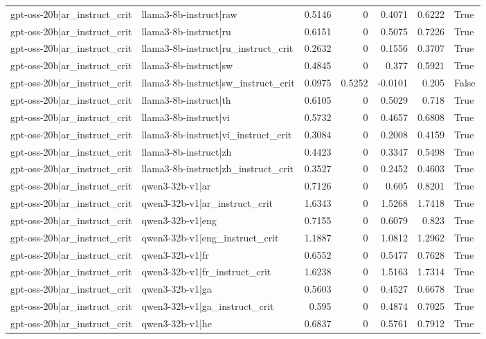\begin{table}
\begin{tabular}{l l r r r r l}
gpt-oss-20b|ar_instruct_crit & llama3-8b-instruct|raw & 0.5146 & 0 & 0.4071 & 0.6222 & True \\
gpt-oss-20b|ar_instruct_crit & llama3-8b-instruct|ru & 0.6151 & 0 & 0.5075 & 0.7226 & True \\
gpt-oss-20b|ar_instruct_crit & llama3-8b-instruct|ru_instruct_crit & 0.2632 & 0 & 0.1556 & 0.3707 & True \\
gpt-oss-20b|ar_instruct_crit & llama3-8b-instruct|sw & 0.4845 & 0 & 0.377 & 0.5921 & True \\
gpt-oss-20b|ar_instruct_crit & llama3-8b-instruct|sw_instruct_crit & 0.0975 & 0.5252 & -0.0101 & 0.205 & False \\
gpt-oss-20b|ar_instruct_crit & llama3-8b-instruct|th & 0.6105 & 0 & 0.5029 & 0.718 & True \\
gpt-oss-20b|ar_instruct_crit & llama3-8b-instruct|vi & 0.5732 & 0 & 0.4657 & 0.6808 & True \\
gpt-oss-20b|ar_instruct_crit & llama3-8b-instruct|vi_instruct_crit & 0.3084 & 0 & 0.2008 & 0.4159 & True \\
gpt-oss-20b|ar_instruct_crit & llama3-8b-instruct|zh & 0.4423 & 0 & 0.3347 & 0.5498 & True \\
gpt-oss-20b|ar_instruct_crit & llama3-8b-instruct|zh_instruct_crit & 0.3527 & 0 & 0.2452 & 0.4603 & True \\
gpt-oss-20b|ar_instruct_crit & qwen3-32b-v1|ar & 0.7126 & 0 & 0.605 & 0.8201 & True \\
gpt-oss-20b|ar_instruct_crit & qwen3-32b-v1|ar_instruct_crit & 1.6343 & 0 & 1.5268 & 1.7418 & True \\
gpt-oss-20b|ar_instruct_crit & qwen3-32b-v1|eng & 0.7155 & 0 & 0.6079 & 0.823 & True \\
gpt-oss-20b|ar_instruct_crit & qwen3-32b-v1|eng_instruct_crit & 1.1887 & 0 & 1.0812 & 1.2962 & True \\
gpt-oss-20b|ar_instruct_crit & qwen3-32b-v1|fr & 0.6552 & 0 & 0.5477 & 0.7628 & True \\
gpt-oss-20b|ar_instruct_crit & qwen3-32b-v1|fr_instruct_crit & 1.6238 & 0 & 1.5163 & 1.7314 & True \\
gpt-oss-20b|ar_instruct_crit & qwen3-32b-v1|ga & 0.5603 & 0 & 0.4527 & 0.6678 & True \\
gpt-oss-20b|ar_instruct_crit & qwen3-32b-v1|ga_instruct_crit & 0.595 & 0 & 0.4874 & 0.7025 & True \\
gpt-oss-20b|ar_instruct_crit & qwen3-32b-v1|he & 0.6837 & 0 & 0.5761 & 0.7912 & True \\

\end{tabular}
\end{table}
